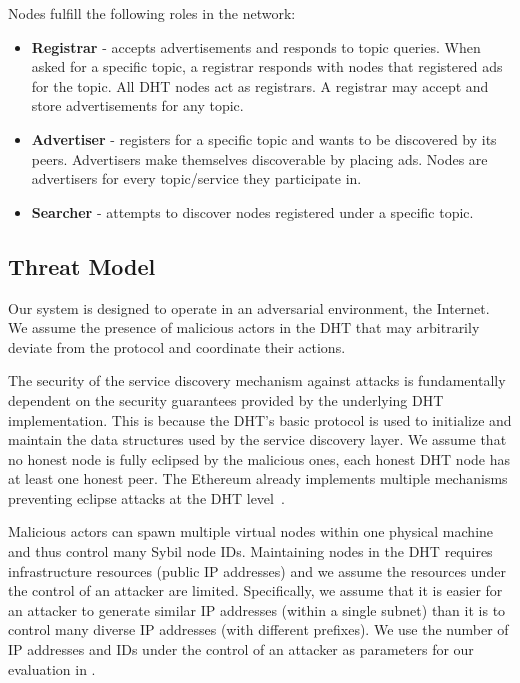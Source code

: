 Nodes fulfill the following roles in the network:

\begin{itemize}
    \item \textbf{Registrar} - accepts advertisements and responds to topic queries. When asked for a specific topic, a registrar responds with nodes that registered ads for the topic.  All DHT nodes act as registrars. A registrar may accept and store advertisements for any topic.
    \item \textbf{Advertiser} - registers for a specific topic and wants to be discovered by its peers. Advertisers make themselves discoverable by placing ads. Nodes are advertisers for every topic/service they participate in.
    \item \textbf{Searcher} - attempts to discover nodes registered under a specific topic.
\end{itemize}

\subsection{Threat Model}
\label{sec:threat}
Our system is designed to operate in an adversarial environment, \ie the Internet. We assume the presence of malicious actors in the DHT that may arbitrarily deviate from the protocol and coordinate their actions.

The security of the service discovery mechanism against attacks is fundamentally dependent on the security guarantees provided by the underlying DHT implementation. This is because the DHT's basic protocol is used to initialize and maintain the data structures used by the service discovery layer. We assume that no honest node is fully eclipsed by the malicious ones, \ie each honest DHT node has at least one honest peer. The Ethereum already implements multiple mechanisms preventing eclipse attacks at the DHT level~\cite{marcus2018low, henningsen2019eclipsing}.  

Malicious actors can spawn multiple virtual nodes within one physical machine and thus control many Sybil node IDs. Maintaining nodes in the DHT requires infrastructure resources (public IP addresses) and we assume the resources under the control of an attacker are limited. Specifically, we assume that it is easier for an attacker to generate similar IP addresses (\ie within a single subnet) than it is to control many diverse IP addresses (with different prefixes). We use the number of IP addresses and IDs under the control of an attacker as parameters for our evaluation in .

